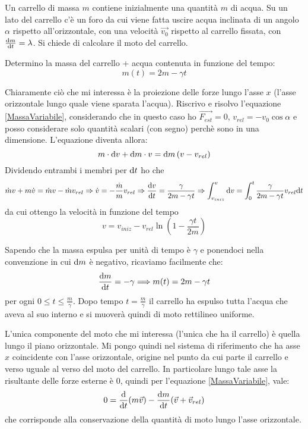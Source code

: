 \documentclass[../main.tex]{subfiles}
\begin{document}

\textex
Un carrello di massa $m$ contiene inizialmente una quantità $m$ di acqua.
Su un lato del carrello c'è un foro da cui viene fatta uscire acqua inclinata di un angolo $\alpha$ rispetto all'orizzontale, con una velocità $\overrightarrow {v_0}$ rispetto al carrello fissata, con $\frac{\mathrm{d} m}{\mathrm{d} t}=\lambda$.
Si chiede di calcolare il moto del carrello.


\solution
Determino la massa del carrello + acqua contenuta in funzione del tempo:
\begin{equation*}\label{csa:MassaTempo}
m(t) = 2m-\gamma t
\end{equation*}

Chiaramente ciò che mi interessa è la proiezione delle forze lungo l'asse $x$ (l'asse orizzontale lungo quale viene sparata l'acqua). Riscrivo e risolvo l'equazione \cref{MassaVariabile},  considerando che in questo caso ho $\overrightarrow{F_{est}}=0$,  $v_{rel} = -v_0\cos\alpha$ e posso considerare solo quantità scalari (con segno) perchè sono in una dimensione.
L'equazione diventa allora:
\begin{equation*}
m\cdot \mathrm{d} v + \mathrm{d} m \cdot v = \mathrm{d} m\left ( v - v_{rel}\right )
\end{equation*}
Dividendo entrambi i membri per $\mathrm{d} t$ ho che 
\begin{equation*}
\dot m v + m\dot v = \dot m v - \dot m v_{rel}\Rightarrow \dot v = - \frac{\dot m}{m}v_{rel} \Rightarrow 
\frac{\mathrm{d} v}{\mathrm{d} t} = \frac{\gamma}{2m-\gamma t} \Rightarrow \int_{v_{iniz}}^{v} \mathrm{d} v = \int_{0}^{t}\frac{\gamma}{2m-\gamma t}v_{rel}\mathrm{d} t
\end{equation*}
da cui ottengo la velocità in funzione del tempo
\begin{equation*}
v = v_{iniz} -v_{rel}\ln \left ( 1-\frac{\gamma t}{2m}\right )
\end{equation*}

\solution[2]
Sapendo che la massa espulsa per unità di tempo è $\gamma$ e ponendoci nella convenzione in cui $\mathrm{d} m$ è negativo, ricaviamo facilmente che:
\begin{equation*}
	\frac{\mathrm{d} m}{\mathrm{d} t}=-\gamma \Longrightarrow m(t)=2m-\gamma t
\end{equation*}
per ogni $0\le t \le \frac{m}{\gamma}$. Dopo tempo $t=\frac{m}{\gamma}$ il carrello ha espulso tutta l'acqua che aveva al suo interno e si muoverà quindi di moto rettilineo uniforme.

L'unica componente del moto che mi interessa (l'unica che ha il carrello) è quella lungo il piano orizzontale. Mi pongo quindi nel sistema di riferimento che ha asse $x$ coincidente con l'asse orizzontale, origine nel punto da cui parte il carrello e verso uguale al verso del moto del carrello.
In particolare lungo tale asse la risultante delle forze esterne è 0, quindi per l'equazione \cref{MassaVariabile}, vale:
\begin{equation*}
	0=\frac{\mathrm{d}}{\mathrm{d} t} (m\vec v)-\frac{\mathrm{d} m}{\mathrm{d} t}(\vec v+\vec{v}_{rel})
\end{equation*}
che corrisponde alla conservazione della quantità di moto lungo l'asse orizzontale.
\end{document}
